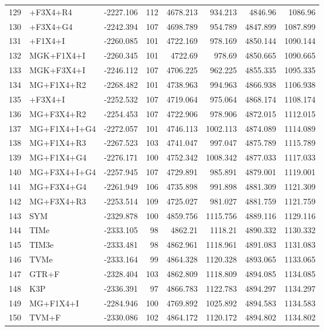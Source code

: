 \begin{longtable}{clrrrrrr}
	129 & \gy+F3X4+R4 & -2227.106 & 112 & 4678.213 & 934.213 & 4846.96 & 1086.96 \\ 
	130 & \gy+F3X4+G4 & -2242.394 & 107 & 4698.789 & 954.789 & 4847.899 & 1087.899 \\ 
	131 & \gy+F1X4+I & -2260.085 & 101 & 4722.169 & 978.169 & 4850.144 & 1090.144 \\ 
	132 & MGK+F1X4+I & -2260.345 & 101 & 4722.69 & 978.69 & 4850.665 & 1090.665 \\ 
	133 & MGK+F3X4+I & -2246.112 & 107 & 4706.225 & 962.225 & 4855.335 & 1095.335 \\ 
	134 & MG+F1X4+R2 & -2268.482 & 101 & 4738.963 & 994.963 & 4866.938 & 1106.938 \\ 
	135 & \gy+F3X4+I & -2252.532 & 107 & 4719.064 & 975.064 & 4868.174 & 1108.174 \\ 
	136 & MG+F3X4+R2 & -2254.453 & 107 & 4722.906 & 978.906 & 4872.015 & 1112.015 \\ 
	137 & MG+F1X4+I+G4 & -2272.057 & 101 & 4746.113 & 1002.113 & 4874.089 & 1114.089 \\ 
	138 & MG+F1X4+R3 & -2267.523 & 103 & 4741.047 & 997.047 & 4875.789 & 1115.789 \\ 
	139 & MG+F1X4+G4 & -2276.171 & 100 & 4752.342 & 1008.342 & 4877.033 & 1117.033 \\ 
	140 & MG+F3X4+I+G4 & -2257.945 & 107 & 4729.891 & 985.891 & 4879.001 & 1119.001 \\ 
	141 & MG+F3X4+G4 & -2261.949 & 106 & 4735.898 & 991.898 & 4881.309 & 1121.309 \\ 
	142 & MG+F3X4+R3 & -2253.514 & 109 & 4725.027 & 981.027 & 4881.759 & 1121.759 \\ 
	143 & SYM & -2329.878 & 100 & 4859.756 & 1115.756 & 4889.116 & 1129.116 \\ 
	144 & TIMe & -2333.105 & 98 & 4862.21 & 1118.21 & 4890.332 & 1130.332 \\ 
	145 & TIM3e & -2333.481 & 98 & 4862.961 & 1118.961 & 4891.083 & 1131.083 \\ 
	146 & TVMe & -2333.164 & 99 & 4864.328 & 1120.328 & 4893.065 & 1133.065 \\ 
	147 & GTR+F & -2328.404 & 103 & 4862.809 & 1118.809 & 4894.085 & 1134.085 \\ 
	148 & K3P & -2336.391 & 97 & 4866.783 & 1122.783 & 4894.297 & 1134.297 \\ 
	149 & MG+F1X4+I & -2284.946 & 100 & 4769.892 & 1025.892 & 4894.583 & 1134.583 \\ 
	150 & TVM+F & -2330.086 & 102 & 4864.172 & 1120.172 & 4894.802 & 1134.802 \\ 

\end{longtable}
